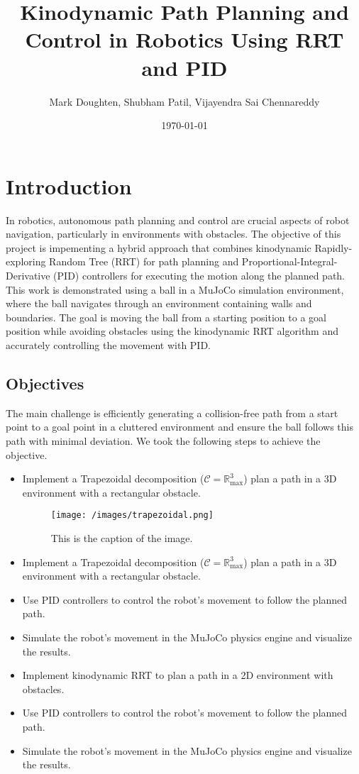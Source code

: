 \documentclass[12pt]{article}
\title{Kinodynamic Path Planning and Control in Robotics Using RRT and PID}
\author{Mark Doughten, Shubham Patil, Vijayendra Sai Chennareddy}
\date{\today}
\begin{document}
\maketitle

\section{Introduction}
In robotics, autonomous path planning and control are crucial aspects of robot navigation, particularly in environments with obstacles. The objective of this project is impementing a hybrid approach that combines kinodynamic Rapidly-exploring Random Tree (RRT) for path planning and Proportional-Integral-Derivative (PID) controllers for executing the motion along the planned path. This work is demonstrated using a ball in a MuJoCo simulation environment, where the ball navigates through an environment containing walls and boundaries. The goal is moving the ball from a starting position to a goal position while avoiding obstacles using the kinodynamic RRT algorithm and accurately controlling the movement with PID.

\subsection{Objectives}
The main challenge is efficiently generating a collision-free path from a start point to a goal point in a cluttered environment and ensure the ball follows this path with minimal deviation. We took the following steps to achieve the objective.
\begin{itemize}
    \item Implement a Trapezoidal decomposition (\(\mathcal{C} = \mathbb{R}^3_{\text{max}}\)) plan a path in a 3D environment with a rectangular obstacle.

    \begin{figure}[h!]
      \centering
      \texttt{[image: /images/trapezoidal.png]}
      \caption{This is the caption of the image.}
      \label{fig:sample_image}
    \end{figure}

    
    \item Implement a Trapezoidal decomposition (\(\mathcal{C} = \mathbb{R}^3_{\text{max}}\)) plan a path in a 3D environment with a rectangular obstacle.
    
    \item Use PID controllers to control the robot's movement to follow the planned path.
    \item Simulate the robot's movement in the MuJoCo physics engine and visualize the results.
    \item Implement kinodynamic RRT to plan a path in a 2D environment with obstacles.
    \item Use PID controllers to control the robot's movement to follow the planned path.
    \item Simulate the robot's movement in the MuJoCo physics engine and visualize the results.
\end{itemize}
\end{document}
